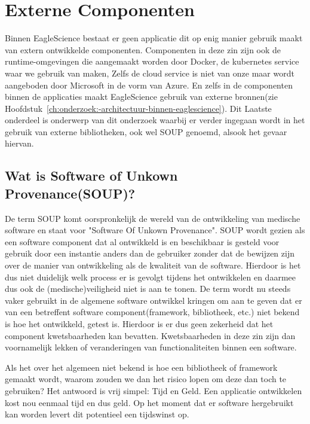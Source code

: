 \section{Externe Componenten}\label{sec:software-of-unkown-provenance}
Binnen EagleScience bestaat er geen applicatie dit op enig manier gebruik maakt van extern ontwikkelde componenten. Componenten in deze zin zijn ook de runtime-omgevingen die aangemaakt worden door Docker, de kubernetes service waar we gebruik van maken, Zelfs de cloud service is niet van onze maar wordt aangeboden door Microsoft in de vorm van Azure. En zelfs in de componenten binnen de applicaties maakt EagleScience gebruik van externe bronnen(zie Hoofdstuk~\ref{ch:onderzoek:-architectuur-binnen-eaglescience}). Dit Laatste onderdeel is onderwerp van dit onderzoek waarbij er verder ingegaan wordt in het gebruik van externe bibliotheken, ook wel SOUP genoemd, alsook het gevaar hiervan.

\subsection{Wat is Software of Unkown Provenance(SOUP)?}\label{subsec:wat-is-soup?2}
De term SOUP komt oorspronkelijk de wereld van de ontwikkeling van medische software en staat voor "Software Of Unkown Provenance".
SOUP wordt gezien als een software component dat al ontwikkeld is en beschikbaar is gesteld voor gebruik door een instantie anders dan de gebruiker zonder dat de bewijzen zijn over de manier van ontwikkeling als de kwaliteit van de software.
Hierdoor is het dus niet duidelijk welk process er is gevolgt tijdens het ontwikkelen en daarmee dus ook de (medische)veiligheid niet is aan te tonen.
De term wordt nu steeds vaker gebruikt in de algemene software ontwikkel kringen om aan te geven dat er van een betreffent software component(framework, bibliotheek, etc.) niet bekend is hoe het ontwikkeld, getest is.
Hierdoor is er dus geen zekerheid dat het component kwetsbaarheden kan bevatten.
Kwetsbaarheden in deze zin zijn dan voornamelijk lekken of veranderingen van functionaliteiten binnen een software.

Als het over het algemeen niet bekend is hoe een bibliotheek of framework gemaakt wordt, waarom zouden we dan het risico lopen om deze dan toch te gebruiken? Het antwoord is vrij simpel: Tijd en Geld. Een applicatie ontwikkelen kost nou eenmaal tijd en dus geld. Op het moment dat er software hergebruikt kan worden levert dit potentieel een tijdswinst op.


